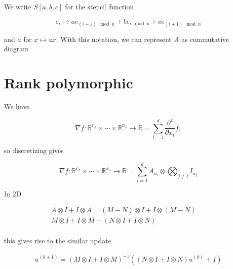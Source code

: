 \documentclass{article}
\begin{document}
We write $S[a, b, c]$ for the stencil function 

\[
    e_i \mapsto ae_{(i - 1) \mod n} + be_{i \mod n} + c e_{(i + 1) \mod n}
\]

and $a$ for $x \mapsto ax$. With this notation, we can represent $A$ as 
commutative diagram


\color{red}{This does not seem to work. If I delete the - and switch the 
stencils it does... Split incorrect?}

\section{Rank polymorphic}

We have

\[
\nabla f: \mathbb{R^{n_1}} \times \cdots \times \mathbb{R^{n_d}} \to \mathbb{R} 
= \sum_{i = 1}^{d} \frac{\partial^2}{\partial x_i} f,
\]

so discretizing gives

\[
\nabla f: \mathbb{R^{n_1}} \times \cdots \times \mathbb{R^{n_d}} \to \mathbb{R} 
= \sum_{i = 1}^d A_{n_i} \otimes \bigotimes_{j \neq i} I_{n_j}
\]

In 2D

\begin{align*}
    A \otimes I + I \otimes A = (M - N) \otimes I + I \otimes (M - N) = \\
    M \otimes I + I \otimes M - (N \otimes I + I \otimes N) \\
\end{align*}

this gives rise to the similar update

\begin{align*}
    u^{(k + 1)} = (M \otimes I + I \otimes M)^{-1} 
            \left((N \otimes I + I \otimes N)u^{(k)} + f \right)
\end{align*}
\end{document}
